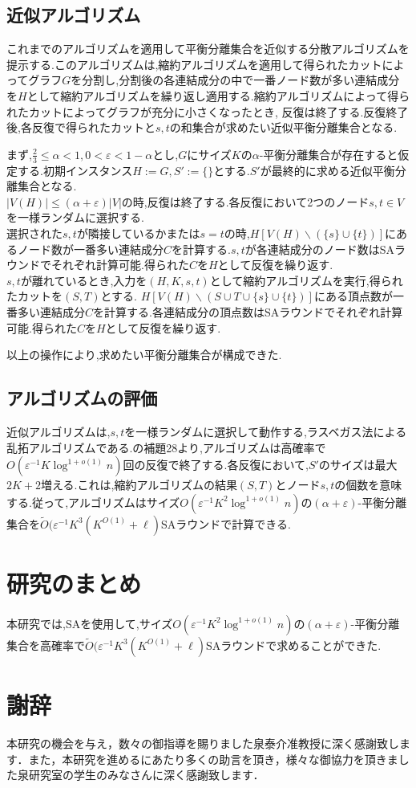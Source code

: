 \documentclass{thesis}
\theoremstyle{definition}
\begin{document}
\section{近似アルゴリズム}
これまでのアルゴリズムを適用して平衡分離集合を近似する分散アルゴリズムを提示する.このアルゴリズムは,縮約アルゴリズムを適用して得られたカットによってグラフ$G$を分割し,分割後の各連結成分の中で一番ノード数が多い連結成分を$H$として縮約アルゴリズムを繰り返し適用する.縮約アルゴリズムによって得られたカットによってグラフが充分に小さくなったとき, 反復は終了する.反復終了後,各反復で得られたカットと$s,t$の和集合が求めたい近似平衡分離集合となる.\par
まず,$\frac{2}{3} \leq \alpha < 1,0 < \varepsilon < 1-\alpha$とし,$G$にサイズ$K$の$\alpha$-平衡分離集合が存在すると仮定する.初期インスタンス$H:=G,S':= \{\}$とする.$S'$が最終的に求める近似平衡分離集合となる.\\
$|V(H)|\leq (\alpha + \varepsilon)|V|$の時,反復は終了する.各反復において2つのノード$s,t \in V$を一様ランダムに選択する.\\
選択された$s,t$が隣接しているかまたは$s = t$の時,$H[V(H) \backslash (\{s\} \cup \{t\})]$にあるノード数が一番多い連結成分$C$を計算する.$s,t$が各連結成分のノード数はSAラウンドでそれぞれ計算可能.得られた$C$を$H$として反復を繰り返す.\\
$s,t$が離れているとき,入力を$(H,K,s,t)$として縮約アルゴリズムを実行,得られたカットを$(S,T)$とする.
$H[V(H) \backslash (S \cup T \cup \{s\} \cup \{t\})]$にある頂点数が一番多い連結成分$C$を計算する.各連結成分の頂点数はSAラウンドでそれぞれ計算可能.得られた$C$を$H$として反復を繰り返す.\par
以上の操作により,求めたい平衡分離集合が構成できた.

\section{アルゴリズムの評価}
近似アルゴリズムは,$s,t$を一様ランダムに選択して動作する,ラスベガス法による乱拓アルゴリズムである.\cite{brandt2017approximating}の補題28より,アルゴリズムは高確率で$O(\varepsilon^{-1}K\log^{1+o(1)}n)$回の反復で終了する.各反復において,$S'$のサイズは最大$2K+2$増える.これは,縮約アルゴリズムの結果$(S,T)$とノード$s,t$の個数を意味する.従って,アルゴリズムはサイズ$O(\varepsilon^{-1}K^2\log^{1+o(1)}n)$の$(\alpha + \varepsilon)$-平衡分離集合を$\tilde{O}(\varepsilon^{-1}K^3(K^{O(1)}+\ell)$SAラウンドで計算できる.

\chapter{研究のまとめ}
本研究では,SAを使用して,サイズ$O(\varepsilon^{-1}K^2\log^{1+o(1)}n)$の$(\alpha + \varepsilon)$-平衡分離集合を高確率で$\tilde{O}(\varepsilon^{-1}K^3(K^{O(1)}+\ell)$SAラウンドで求めることができた.

\chapter{謝辞}
本研究の機会を与え，数々の御指導を賜りました泉泰介准教授に深く感謝致します．また，本研究を進めるにあたり多くの助言を頂き，様々な御協力を頂きました泉研究室の学生のみなさんに深く感謝致します．




%
\end{document}
